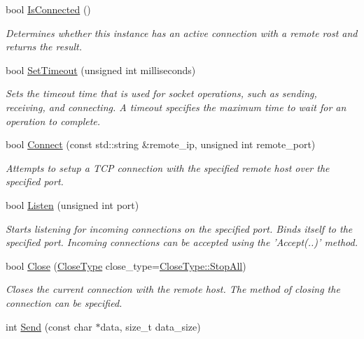 \begin{DoxyCompactItemize}
bool \hyperlink{class_senergy_1_1_socket_a6d22575e6fc0d6ab4a61097d60b6e773}{Is\-Connected} ()
\begin{DoxyCompactList}\small\item\em Determines whether this instance has an active connection with a remote rost and returns the result. \end{DoxyCompactList}\item 
bool \hyperlink{class_senergy_1_1_socket_a7ca3e4fb2e2f216773498e6f29e9ea14}{Set\-Timeout} (unsigned int milliseconds)
\begin{DoxyCompactList}\small\item\em Sets the timeout time that is used for socket operations, such as sending, receiving, and connecting. A timeout specifies the maximum time to wait for an operation to complete. \end{DoxyCompactList}\item 
bool \hyperlink{class_senergy_1_1_socket_a75946ce55f263abb105a22611819e11e}{Connect} (const std\-::string \&remote\-\_\-ip, unsigned int remote\-\_\-port)
\begin{DoxyCompactList}\small\item\em Attempts to setup a T\-C\-P connection with the specified remote host over the specified port. \end{DoxyCompactList}\item 
bool \hyperlink{class_senergy_1_1_socket_a9f2cfa080e3a5f365b52cc5fff94eb74}{Listen} (unsigned int port)
\begin{DoxyCompactList}\small\item\em Starts listening for incoming connections on the specified port. Binds itself to the specified port. Incoming connections can be accepted using the 'Accept(..)' method. \end{DoxyCompactList}\item 
bool \hyperlink{class_senergy_1_1_socket_a859e2c4eec6792215f04363404658b0a}{Close} (\hyperlink{class_senergy_1_1_socket_a88ed1eb1a5c47ea1b395715aabd37ab4}{Close\-Type} close\-\_\-type=\hyperlink{class_senergy_1_1_socket_a88ed1eb1a5c47ea1b395715aabd37ab4a40b522922220c34afd8e1d4a3ba02208}{Close\-Type\-::\-Stop\-All})
\begin{DoxyCompactList}\small\item\em Closes the current connection with the remote host. The method of closing the connection can be specified. \end{DoxyCompactList}\item 
int \hyperlink{class_senergy_1_1_socket_a1407e054edc1fd012d8c85e563683947}{Send} (const char $\ast$data, size\-\_\-t data\-\_\-size)

\end{DoxyCompactItemize}
